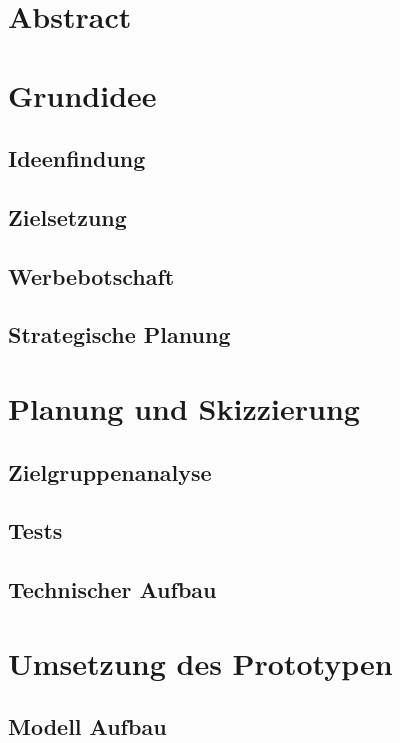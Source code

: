 






\section*{Abstract}


\tableofcontents
\clearpage



\section{Grundidee}
\subsection{Ideenfindung}
\subsection{Zielsetzung}
\subsection{Werbebotschaft}
\subsection{Strategische Planung}

\section{Planung und Skizzierung}
\subsection{Zielgruppenanalyse}
\subsection{Tests}
\subsection{Technischer Aufbau}

\section{Umsetzung des Prototypen}
\subsection{Modell Aufbau}
\newpage
